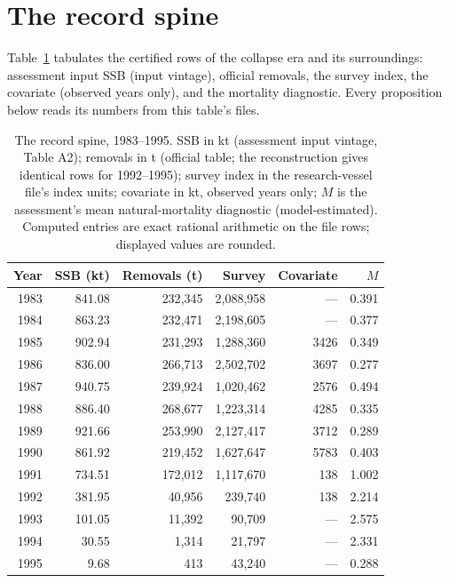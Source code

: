 \section{The record spine}\label{regime-spine}

Table~\ref{regime-tab:spine} tabulates the certified rows of the collapse era
and its surroundings: assessment input SSB (input vintage), official
removals, the survey index, the covariate (observed years only), and
the mortality diagnostic. Every proposition below reads its numbers
from this table's files.

\begin{table}[t]
\centering
\scriptsize
\setlength{\tabcolsep}{2.8pt}
\caption{The record spine, 1983--1995. SSB in kt (assessment input
vintage, Table A2); removals in t (official table; the reconstruction
gives identical rows for 1992--1995); survey index in the
research-vessel file's index units; covariate in kt, observed years
only; \(M\) is the assessment's mean natural-mortality diagnostic
(model-estimated). Computed entries are exact rational arithmetic on
the file rows; displayed values are rounded.}
\label{regime-tab:spine}
\begin{tabular}{@{}r r r r r r@{}}
\toprule
Year & SSB (kt) & Removals (t) & Survey & Covariate & \(M\) \\
\midrule
1983 & 841.08 & 232{,}345 & 2{,}088{,}958 & --- & 0.391 \\
1984 & 863.23 & 232{,}471 & 2{,}198{,}605 & --- & 0.377 \\
1985 & 902.94 & 231{,}293 & 1{,}288{,}360 & 3426 & 0.349 \\
1986 & 836.00 & 266{,}713 & 2{,}502{,}702 & 3697 & 0.277 \\
1987 & 940.75 & 239{,}924 & 1{,}020{,}462 & 2576 & 0.494 \\
1988 & 886.40 & 268{,}677 & 1{,}223{,}314 & 4285 & 0.335 \\
1989 & 921.66 & 253{,}990 & 2{,}127{,}417 & 3712 & 0.289 \\
1990 & 861.92 & 219{,}452 & 1{,}627{,}647 & 5783 & 0.403 \\
1991 & 734.51 & 172{,}012 & 1{,}117{,}670 & 138 & 1.002 \\
1992 & 381.95 & 40{,}956 & 239{,}740 & 138 & 2.214 \\
1993 & 101.05 & 11{,}392 & 90{,}709 & --- & 2.575 \\
1994 & 30.55 & 1{,}314 & 21{,}797 & --- & 2.331 \\
1995 & 9.68 & 413 & 43{,}240 & --- & 0.288 \\
\bottomrule
\end{tabular}
\end{table}

